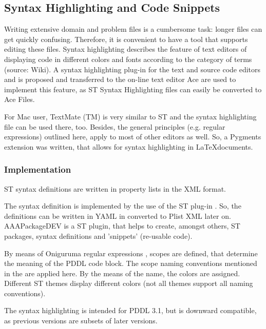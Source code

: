 \documentclass[11pt]{article}
\begin{document}
\subsection{Syntax Highlighting and Code Snippets}
\label{sec-4-2}
\label{sec:syntax}


Writing extensive domain and problem files is a cumbersome task:
longer files can get quickly confusing. Therefore, it is convenient to
have a tool that supports editing these files. Syntax highlighting
describes the feature of text editors of displaying code in different
colors and fonts according to the category of terms (source: Wiki). A
syntax highlighting plug-in for the text and source code editors
\textcite{sublimetext2} and \textcite{sublimetext3} is proposed and
transferred to the on-line text editor Ace are used to implement this
feature, as ST Syntax Highlighting files can easily be converted to
Ace Files. 

For Mac user, TextMate (TM) is very similar to ST and the syntax
highlighting file can be used there, too. Besides, the general
principles (e.g. regular expressions) outlined here, apply to most of
other editors as well. So, a Pygments extension was written, that
allows for syntax highlighting in \LaTeX documents.


\subsubsection{Implementation}
\label{sec-4-2-1}
ST syntax definitions are written in property lists in the XML format.

The syntax definition is implemented by the use of the ST plug-in
\textcite{aaapackagedev}. So, the definitions can be written in YAML
in converted to Plist XML later on.
AAAPackageDEV\textcite{aaapackagedev} is a ST plugin, that helps to
create, amongst others, ST packages, syntax definitions and 'snippets'
(re-usable code).

By means of Oniguruma regular expressions \parencite{kosako}, scopes
are defined, that determine the meaning of the PDDL code block. The
scope naming conventions mentioned in the  are
applied here. By the means of the name, the colors are assigned.
Different ST themes display different colors (not all themes support
all naming conventions).

The syntax highlighting is intended for PDDL 3.1, but is downward
compatible, as previous versions are subsets of later versions.
\begin{center}
\end{center}
\end{document}
